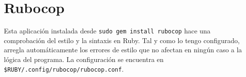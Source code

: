 \documentclass{article}
\begin{document}
    \section{Rubocop}
    Esta aplicación instalada desde \texttt{sudo gem install rubocop} hace
    una comprobación del estilo y la sintaxis en Ruby. Tal y como lo
    tengo configurado, arregla automáticamente los errores de estilo
    que no afectan en ningún caso a la lógica del programa. La
    configuración se encuentra en
    \texttt{\$RUBY/.config/rubocop/rubocop.conf}.
    
    \inputminted[breaklines, breakanywhere, breaksymbolleft="", breaksymbolright="", breakanywheresymbolpre="", breakanywheresymbolpost=""]
    {yaml}{inc/rubocop.yml}
\end{document}
